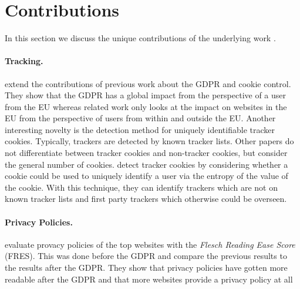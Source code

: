 \section{Contributions}
\label{sec:contrib}

In this section we discuss the unique contributions of the underlying work \cite{sanchez2019can}.

\paragraph{Tracking.}

\citeauthor{sanchez2019can} extend the contributions of previous work about the GDPR and cookie control. They show that
the GDPR has a global impact from the perspective of a user from the EU whereas related work only looks at the impact on
websites in the EU from the perspective of users from within and outside the EU. Another interesting novelty is the
detection method for uniquely identifiable tracker cookies. Typically, trackers are detected by known tracker lists.
Other papers do not differentiate between tracker cookies and non-tracker cookies, but consider the general number of
cookies. \citeauthor{sanchez2019can} detect tracker cookies by considering whether a cookie could be used to uniquely
identify a user via the entropy of the value of the cookie. With this technique, they can identify trackers which are not on known
tracker lists and first party trackers which otherwise could be overseen.

\paragraph{Privacy Policies.}

\citeauthor{sanchez2019can} evaluate provacy policies of the top websites with the \emph{Flesch Reading Ease Score}
(FRES). This was done before the GDPR and \citeauthor{sanchez2019can} compare the previous results to the results after the
GDPR. They show that privacy policies have gotten more readable after the GDPR and that more websites provide a privacy
policy at all%

